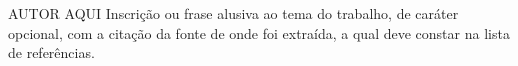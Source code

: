 

\begin{epigraph}{AUTOR AQUI}
Inscrição ou frase alusiva ao tema do trabalho, de caráter opcional, com a citação da fonte de onde foi extraída, a qual deve constar na lista de referências.\\
\end{epigraph}